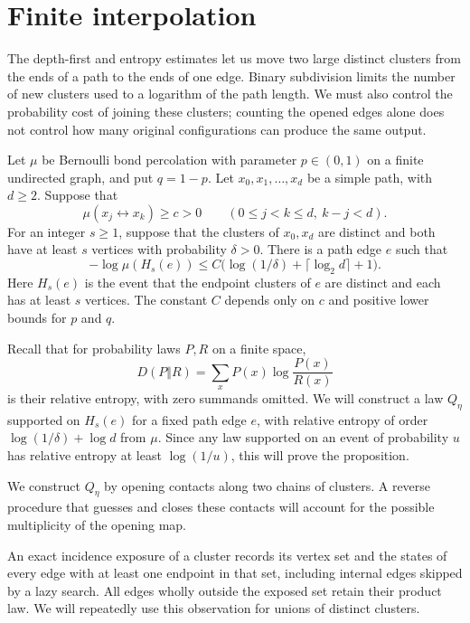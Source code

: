 \section{Finite interpolation}\label{sec:interpolation}

The depth-first and entropy estimates let us move two large distinct
clusters from the ends of a path to the ends of one edge. Binary
subdivision limits the number of new clusters used to a logarithm of
the path length. We must also control the probability cost of joining
these clusters; counting the opened edges alone does not control how
many original configurations can produce the same output.

\begin{proposition}\label{prop:interpolation}
Let $\mu$ be Bernoulli bond percolation with parameter $p\in(0,1)$ on
a finite undirected graph, and put $q=1-p$. Let
$x_0,x_1,\ldots,x_d$ be a simple path, with $d\ge2$. Suppose that
\[
 \mu(x_j\leftrightarrow x_k)\ge c>0
 \qquad(0\le j<k\le d,\ k-j<d).
\]
For an integer $s\ge1$, suppose that the clusters of $x_0,x_d$ are
distinct and both have at least $s$ vertices with probability
$\delta>0$. There is a path edge $e$ such that
\[
 -\log\mu(H_s(e))
 \le C\bigl(\log(1/\delta)+\lceil\log_2d\rceil+1\bigr).
\]
Here $H_s(e)$ is the event that the endpoint clusters of $e$ are
distinct and each has at least $s$ vertices. The constant $C$ depends
only on $c$ and positive lower bounds for $p$ and $q$.
\end{proposition}

Recall that for probability laws $P,R$ on a finite space,
\[
 D(P\Vert R)=\sum_x P(x)\log\frac{P(x)}{R(x)}
\]
is their relative entropy, with zero summands omitted. We will construct
a law $Q_\eta$ supported on $H_s(e)$ for a fixed path edge $e$, with
relative entropy of order $\log(1/\delta)+\log d$ from $\mu$.
Since any law supported on an event of probability $u$ has relative
entropy at least $\log(1/u)$, this will prove the proposition.

We construct $Q_\eta$ by opening contacts along two chains of clusters.
A reverse procedure that guesses and closes these contacts will account
for the possible multiplicity of the opening map.

An exact incidence exposure of a cluster records its vertex set and the
states of every edge with at least one endpoint in that set, including
internal edges skipped by a lazy search. All edges wholly outside the
exposed set retain their product law. We will repeatedly use this
observation for unions of distinct clusters.

